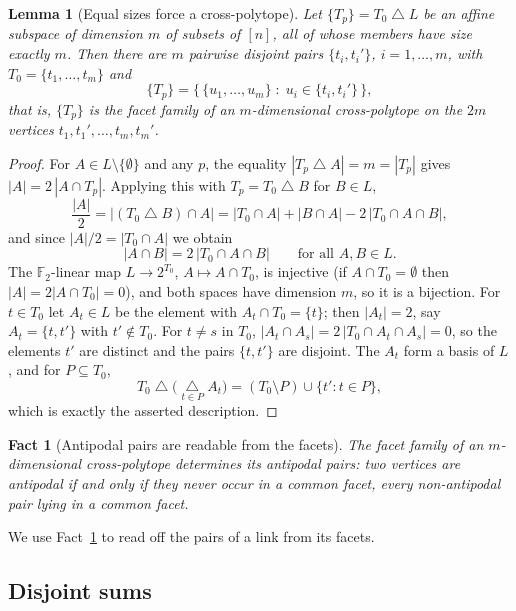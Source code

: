 \documentclass[11pt,reqno]{amsart}
\theoremstyle{plain}
\newtheorem{lemma}[theorem]{Lemma}
\newtheorem{fact}[theorem]{Fact}
\theoremstyle{definition}
\numberwithin{theorem}{section}
\newcommand{\sd}{\mathbin{\triangle}}
\newcommand{\bbF}{\mathbb{F}}
\begin{document}
\begin{lemma}[Equal sizes force a cross-polytope]\label{lem:B}
Let $\{T_p\} = T_0 \sd L$ be an affine subspace of dimension $m$ of subsets of $[n]$, all of
whose members have size exactly $m$. Then there are $m$ pairwise disjoint pairs
$\{t_i, t_i'\}$, $i = 1, \dots, m$, with $T_0 = \{t_1, \dots, t_m\}$ and
\[
  \{T_p\} = \big\{\, \{u_1, \dots, u_m\} \;:\; u_i \in \{t_i, t_i'\} \,\big\},
\]
that is, $\{T_p\}$ is the facet family of an $m$-dimensional cross-polytope on the $2m$
vertices $t_1, t_1', \dots, t_m, t_m'$.
\end{lemma}

\begin{proof}
For $A \in L \setminus \{\emptyset\}$ and any $p$, the equality $|T_p \sd A| = m = |T_p|$ gives
$|A| = 2\,|A \cap T_p|$. Applying this with $T_p = T_0 \sd B$ for $B \in L$,
\[
  \frac{|A|}{2} = |(T_0 \sd B) \cap A| = |T_0 \cap A| + |B \cap A| - 2\,|T_0 \cap A \cap B| ,
\]
and since $|A|/2 = |T_0 \cap A|$ we obtain
\[
  |A \cap B| = 2\,|T_0 \cap A \cap B| \qquad \text{for all } A, B \in L.
\]
The $\bbF_2$-linear map $L \to 2^{T_0}$, $A \mapsto A \cap T_0$, is injective (if
$A \cap T_0 = \emptyset$ then $|A| = 2|A \cap T_0| = 0$), and both spaces have dimension $m$, so
it is a bijection. For $t \in T_0$ let $A_t \in L$ be the element with $A_t \cap T_0 = \{t\}$;
then $|A_t| = 2$, say $A_t = \{t, t'\}$ with $t' \notin T_0$. For $t \ne s$ in $T_0$,
$|A_t \cap A_s| = 2\,|T_0 \cap A_t \cap A_s| = 0$, so the elements $t'$ are distinct and the
pairs $\{t,t'\}$ are disjoint. The $A_t$ form a basis of $L$, and for $P \subseteq T_0$,
\[
  T_0 \sd \Big( \mathop{\triangle}\limits_{t \in P} A_t \Big)
  = (T_0 \setminus P) \cup \{ t' : t \in P \},
\]
which is exactly the asserted description.
\end{proof}

\begin{fact}[Antipodal pairs are readable from the facets]\label{fact:antipodal}
The facet family of an $m$-dimensional cross-polytope determines its antipodal pairs: two
vertices are antipodal if and only if they never occur in a common facet, every non-antipodal
pair lying in a common facet.
\end{fact}

We use Fact~\ref{fact:antipodal} to read off the pairs of a link from its facets.

\subsection{Disjoint sums}
\end{document}
